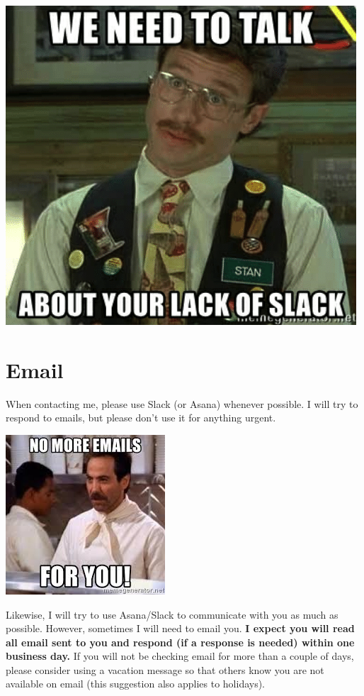 \documentclass[]{book}
\begin{document}
\includegraphics{images/slack.png}

\hypertarget{email}{%
\section{Email}\label{email}}

When contacting me, please use Slack (or Asana) whenever possible. I will try to respond to emails, but please don't use it for anything urgent.

\includegraphics{images/email2.jpeg}

Likewise, I will try to use Asana/Slack to communicate with you as much as possible. However, sometimes I will need to email you. \textbf{I expect you will read all email sent to you and respond (if a response is needed) within one business day.} If you will not be checking email for more than a couple of days, please consider using a vacation message so that others know you are not available on email (this suggestion also applies to holidays).
\end{document}

